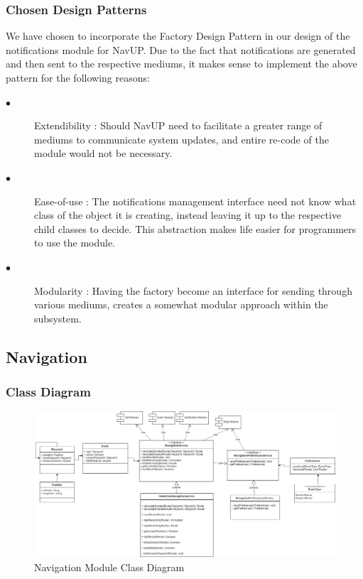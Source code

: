 \documentclass{article}
\begin{document}
        \subsubsection{Chosen Design Patterns}
        
        We have chosen to incorporate the Factory Design Pattern in our design of the notifications module for NavUP. Due to the fact that notifications are generated and then sent to the respective mediums, it makes sense to implement the above pattern for the following reasons:
		\begin{description}	
		
		\item[$\bullet$]Extendibility : Should NavUP need to facilitate a greater range of mediums to communicate system updates, and entire re-code of the module would not be necessary.
		
		\item[$\bullet$]Ease-of-use : The notifications management interface need not know what class of the object it is creating, instead leaving it up to the respective child classes to decide. This abstraction makes life easier for programmers to use the module.
		
		\item[$\bullet$]Modularity : Having the factory become an interface for sending through various mediums, creates a somewhat modular approach within the subsystem.		
		\end{description}
		
    \subsection{Navigation}
        \subsubsection{Class Diagram}
        \begin{figure}[!h]
        	\includegraphics[width=\textwidth]{Navigation_Class_Diagram}
            \caption{Navigation Module Class Diagram}
        \end{figure}
\end{document}
